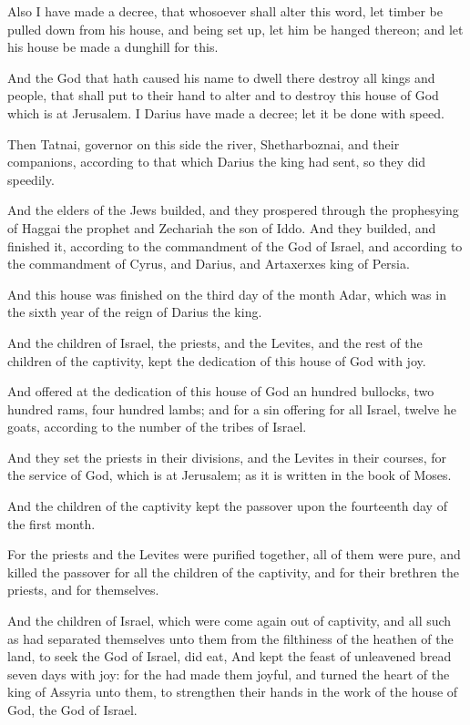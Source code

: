 \Verse Also I have made a decree, that whosoever shall alter this word, let timber be pulled down from his house, and being set up, let him be hanged thereon; and let his house be made a dunghill for this.

\Verse And the God that hath caused his name to dwell there destroy all kings and people, that shall put to their hand to alter and to destroy this house of God which is at Jerusalem. I Darius have made a decree; let it be done with speed.

\Verse Then Tatnai, governor on this side the river, Shetharboznai, and their companions, according to that which Darius the king had sent, so they did speedily.

\Verse And the elders of the Jews builded, and they prospered through the prophesying of Haggai the prophet and Zechariah the son of Iddo.  And they builded, and finished it, according to the commandment of the God of Israel, and according to the commandment of Cyrus, and Darius, and Artaxerxes king of Persia.

\Verse And this house was finished on the third day of the month Adar, which was in the sixth year of the reign of Darius the king.

\Verse And the children of Israel, the priests, and the Levites, and the rest of the children of the captivity, kept the dedication of this house of God with joy.

\Verse And offered at the dedication of this house of God an hundred bullocks, two hundred rams, four hundred lambs; and for a sin offering for all Israel, twelve he goats, according to the number of the tribes of Israel.

\Verse And they set the priests in their divisions, and the Levites in their courses, for the service of God, which is at Jerusalem; as it is written in the book of Moses.

\Verse And the children of the captivity kept the passover upon the fourteenth day of the first month.

\Verse For the priests and the Levites were purified together, all of them were pure, and killed the passover for all the children of the captivity, and for their brethren the priests, and for themselves.

\Verse And the children of Israel, which were come again out of captivity, and all such as had separated themselves unto them from the filthiness of the heathen of the land, to seek the \LORD God of Israel, did eat, \Verse And kept the feast of unleavened bread seven days with joy: for the \LORD had made them joyful, and turned the heart of the king of Assyria unto them, to strengthen their hands in the work of the house of God, the God of Israel.


